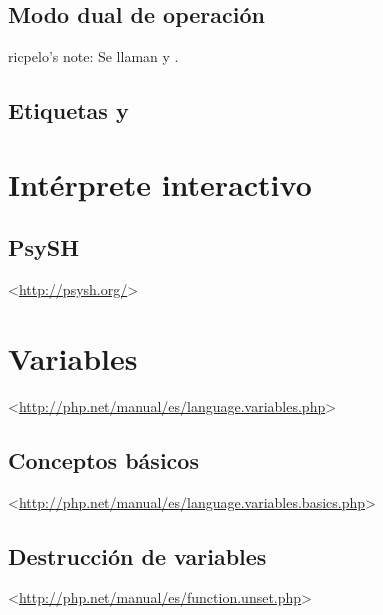 \documentclass[a4paper,11pt,spanish]{sphinxmanual}
\begin{document}
\subsection{Modo dual de operación}
\label{\detokenize{php:modo-dual-de-operacion}}
ricpelo's note: Se llaman  y .


\subsection{Etiquetas  y }
\label{\detokenize{php:etiquetas-php-y}}

\section{Intérprete interactivo}
\label{\detokenize{php:interprete-interactivo}}

\subsection{}
\label{\detokenize{php:php-a}}

\subsection{PsySH}
\label{\detokenize{php:psysh}}
\textless{}\url{http://psysh.org/}\textgreater{}


\section{Variables}
\label{\detokenize{php:variables}}
\textless{}\url{http://php.net/manual/es/language.variables.php}\textgreater{}


\subsection{Conceptos básicos}
\label{\detokenize{php:conceptos-basicos}}
\textless{}\url{http://php.net/manual/es/language.variables.basics.php}\textgreater{}


\subsection{Destrucción de variables}
\label{\detokenize{php:destruccion-de-variables}}
\textless{}\url{http://php.net/manual/es/function.unset.php}\textgreater{}
\end{document}

